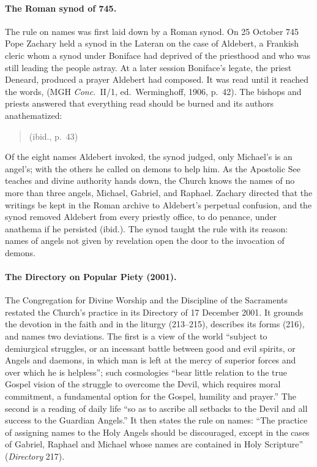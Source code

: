 \paragraph{The Roman synod of 745.} The rule on names was first laid
down by a Roman synod. On 25 October 745 Pope Zachary held a synod in the
Lateran on the case of Aldebert, a Frankish cleric whom a synod under
Boniface had deprived of the priesthood and who was still leading the
people astray. At a later session Boniface's legate, the priest Deneard,
produced a prayer Aldebert had composed. It was read
until it reached the words, 
(MGH \emph{Conc.}\ II/1, ed.\ Werminghoff, 1906, p.~42). The bishops and
priests answered that everything read should be burned and its authors
anathematized:
\begin{quote}
(ibid., p.~43)
\end{quote}
Of the eight names Aldebert invoked, the synod judged, only Michael's is
an angel's; with the others he called on demons to help him. As the
Apostolic See teaches and divine authority hands down, the Church knows
the names of no more than three angels, Michael, Gabriel, and Raphael.
Zachary directed that the writings be kept in the Roman archive to
Aldebert's perpetual confusion, and the synod removed Aldebert from every
priestly office, to do penance, under anathema if he persisted (ibid.). The synod taught the rule with its reason:
names of angels not given by revelation open the door to the invocation of
demons.

\paragraph{The Directory on Popular Piety (2001).} The Congregation for
Divine Worship and the Discipline of the Sacraments restated the Church's
practice in its Directory of 17 December 2001. It grounds the devotion in
the faith and in the liturgy (213--215), describes its forms (216), and
names two deviations. The first is a view of the world ``subject to
demiurgical struggles, or an incessant battle between good and evil
spirits, or Angels and daemons, in which man is left at the mercy of
superior forces and over which he is helpless''; such cosmologies ``bear
little relation to the true Gospel vision of the struggle to overcome the
Devil, which requires moral commitment, a fundamental option for the
Gospel, humility and prayer.'' The second is a reading of daily life
``so as to ascribe all setbacks to the Devil and all success to the
Guardian Angels.'' It then states the rule on names: ``The practice of
assigning names to the Holy Angels should be discouraged, except in the
cases of Gabriel, Raphael and Michael whose names are contained in Holy
Scripture'' (\emph{Directory} 217).

